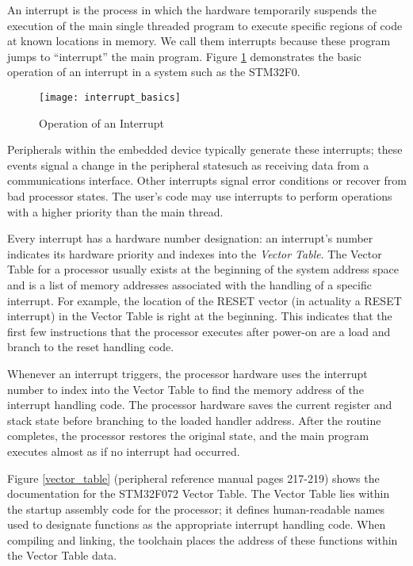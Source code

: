 \documentclass[openany,11pt,fleqn]{book} %
\begin{document}
An interrupt is the process in which the hardware temporarily suspends the execution of the main single threaded program to execute specific regions of code at known locations in memory. We call them interrupts because these program jumps to ``interrupt'' the main program. Figure \ref{interrupt_basics} demonstrates the basic operation of an interrupt in a system such as the STM32F0. 

\begin{figure}[h]
    \centering\texttt{[image: interrupt\_basics]}
    \caption{Operation of an Interrupt}
    \label{interrupt_basics}
\end{figure}

Peripherals within the embedded device typically generate these interrupts; these events signal a change in the peripheral state\textemdash such as receiving data from a communications interface. Other interrupts signal error conditions or recover from bad processor states. The user's code may use interrupts to perform operations with a higher priority than the main thread. 

Every interrupt has a hardware number designation: an interrupt's number indicates its hardware priority and indexes into the \textit{Vector Table}. The Vector Table for a processor usually exists at the beginning of the system address space and is a list of memory addresses associated with the handling of a specific interrupt. For example, the location of the RESET vector (in actuality a RESET interrupt) in the Vector Table is right at the beginning. This indicates that the first few instructions that the processor executes after power-on are a load and branch to the reset handling code. 

Whenever an interrupt triggers, the processor hardware uses the interrupt number to index into the Vector Table to find the memory address of the interrupt handling code. The processor hardware saves the current register and stack state before branching to the loaded handler address. After the routine completes, the processor restores the original state, and the main program executes almost as if no interrupt had occurred. 

Figure \ref{vector_table} (peripheral reference manual pages 217-219) shows the documentation for the STM32F072 Vector Table. The Vector Table lies within the startup assembly code for the processor; it defines human-readable names used to designate functions as the appropriate interrupt handling code. When compiling and linking, the toolchain places the address of these functions within the Vector Table data.  
\end{document}

